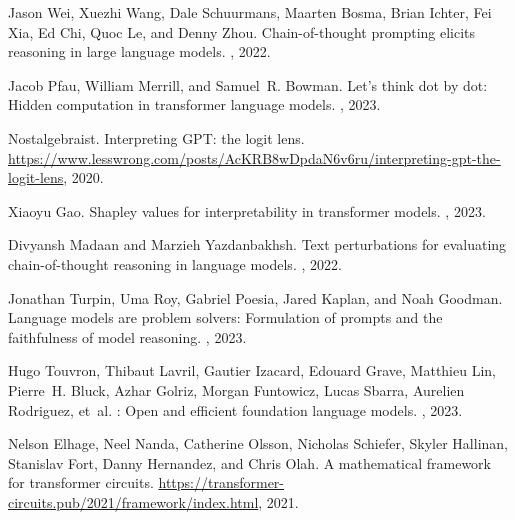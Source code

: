 \documentclass{article}
\begin{document}
\newpage
\begin{thebibliography}{9}

Jason Wei, Xuezhi Wang, Dale Schuurmans, Maarten Bosma, Brian Ichter, Fei Xia,
  Ed Chi, Quoc Le, and Denny Zhou.
\newblock Chain-of-thought prompting elicits reasoning in large language
  models.
, 2022.

Jacob Pfau, William Merrill, and Samuel~R. Bowman.
\newblock Let's think dot by dot: Hidden computation in transformer language
  models.
, 2023.

Nostalgebraist.
\newblock Interpreting {GPT}: the logit lens.
\newblock
  \url{https://www.lesswrong.com/posts/AcKRB8wDpdaN6v6ru/interpreting-gpt-the-logit-lens},
  2020.

Xiaoyu Gao.
\newblock Shapley values for interpretability in transformer models.
, 2023.

Divyansh Madaan and Marzieh Yazdanbakhsh.
\newblock Text perturbations for evaluating chain-of-thought reasoning in
  language models.
, 2022.

Jonathan Turpin, Uma Roy, Gabriel Poesia, Jared Kaplan, and Noah Goodman.
\newblock Language models are problem solvers: Formulation of prompts and the
  faithfulness of model reasoning.
, 2023.

Hugo Touvron, Thibaut Lavril, Gautier Izacard, Edouard Grave, Matthieu
  Lin, Pierre~H. Bluck, Azhar Golriz, Morgan Funtowicz, Lucas
  Sbarra, Aurelien Rodriguez, et~al.
: Open and efficient foundation language models.
, 2023.

Nelson Elhage, Neel Nanda, Catherine Olsson, Nicholas Schiefer, Skyler Hallinan,
  Stanislav Fort, Danny Hernandez, and Chris Olah.
\newblock A mathematical framework for transformer circuits.
\newblock
  \url{https://transformer-circuits.pub/2021/framework/index.html}, 2021.

\end{thebibliography}
\end{document}
